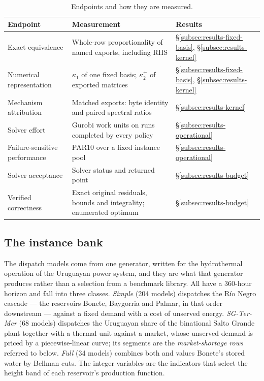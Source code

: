\documentclass[smallextended,envcountsect,envcountsame]{svjour3}
\begin{document}
\begin{table}[tb]
\centering\small
\caption{Endpoints and how they are measured.}\label{tab:endpoints}
\begin{tabularx}{\linewidth}{lXl}
\toprule
Endpoint & Measurement & Results\\
\midrule
Exact equivalence & Whole-row proportionality of named exports, including RHS & \S\ref{subsec:results-fixed-basis}, \S\ref{subsec:results-kernel}\\
Numerical representation & $\kappa_1$ of one fixed basis; $\kappa_2^+$ of exported matrices & \S\ref{subsec:results-fixed-basis}, \S\ref{subsec:results-kernel}\\
Mechanism attribution & Matched exports: byte identity and paired spectral ratios & \S\ref{subsec:results-kernel}\\
Solver effort & Gurobi work units on runs completed by every policy & \S\ref{subsec:results-operational}\\
Failure-sensitive performance & PAR10 over a fixed instance pool & \S\ref{subsec:results-operational}\\
Solver acceptance & Solver status and returned point & \S\ref{subsec:results-budget}\\
Verified correctness & Exact original residuals, bounds and integrality; enumerated optimum & \S\ref{subsec:results-budget}\\
\bottomrule
\end{tabularx}
\end{table}

\subsection{The instance bank}
\label{subsec:design-bank}
The dispatch models come from one generator, written for the hydrothermal operation of the
Uruguayan power system, and they are what that generator produces rather than a selection from
a benchmark library. All have a 360-hour horizon and fall into three classes. \emph{Simple}
(204 models) dispatches the R\'io Negro cascade --- the reservoirs Bonete, Baygorria and
Palmar, in that order downstream --- against a fixed demand with a cost of unserved energy.
\emph{SG-Ter-Mer} (68 models) dispatches the Uruguayan share of the binational Salto Grande
plant together with a thermal unit against a market, whose unserved demand is priced by a
piecewise-linear curve; its segments are the \emph{market-shortage rows} referred to below.
\emph{Full} (34 models) combines both and values Bonete's stored water by Bellman cuts. The
integer variables are the indicators that select the height band of each reservoir's production
function.
\end{document}

